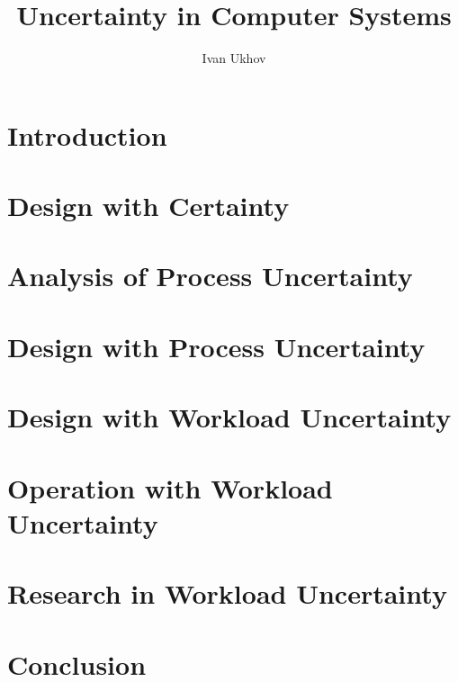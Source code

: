 \documentclass{thesis}
\title{Uncertainty in Computer Systems}
\author{Ivan Ukhov}
\begin{document}
\nocite{ukhov2012, ukhov2014a, ukhov2014b, ukhov2015, ukhov2017}

\chapter{Introduction}
\newcommand{\inputsection}[1]{}


\chapter{Design with Certainty}
\renewcommand{\inputsection}[1]{}


\chapter{Analysis of Process Uncertainty}
\renewcommand{\inputsection}[1]{}


\chapter{Design with Process Uncertainty}
\renewcommand{\inputsection}[1]{}


\chapter{Design with Workload Uncertainty}
\renewcommand{\inputsection}[1]{}


\chapter{Operation with Workload Uncertainty}
\renewcommand{\inputsection}[1]{}


\chapter{Research in Workload Uncertainty}
\renewcommand{\inputsection}[1]{}


\chapter{Conclusion}


\printbibliography
\end{document}
